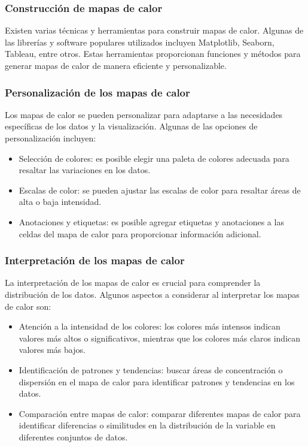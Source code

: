 \documentclass{article}
\begin{document}
\subsubsection{Construcción de mapas de calor}
Existen varias técnicas y herramientas para construir mapas de calor. Algunas de las librerías y software populares utilizados incluyen Matplotlib, Seaborn, Tableau, entre otros. Estas herramientas proporcionan funciones y métodos para generar mapas de calor de manera eficiente y personalizable.

\subsubsection{Personalización de los mapas de calor}
Los mapas de calor se pueden personalizar para adaptarse a las necesidades específicas de los datos y la visualización. Algunas de las opciones de personalización incluyen:

\begin{itemize}
    \item Selección de colores: es posible elegir una paleta de colores adecuada para resaltar las variaciones en los datos.
    \item Escalas de color: se pueden ajustar las escalas de color para resaltar áreas de alta o baja intensidad.
    \item Anotaciones y etiquetas: es posible agregar etiquetas y anotaciones a las celdas del mapa de calor para proporcionar información adicional.
\end{itemize}

\subsubsection{Interpretación de los mapas de calor}
La interpretación de los mapas de calor es crucial para comprender la distribución de los datos. Algunos aspectos a considerar al interpretar los mapas de calor son:

\begin{itemize}
    \item Atención a la intensidad de los colores: los colores más intensos indican valores más altos o significativos, mientras que los colores más claros indican valores más bajos.
    \item Identificación de patrones y tendencias: buscar áreas de concentración o dispersión en el mapa de calor para identificar patrones y tendencias en los datos.
    \item Comparación entre mapas de calor: comparar diferentes mapas de calor para identificar diferencias o similitudes en la distribución de la variable en diferentes conjuntos de datos.
\end{itemize}
\end{document}
